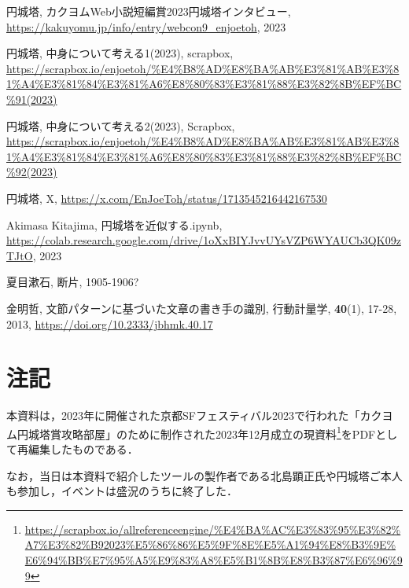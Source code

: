 \documentclass[10pt, a5paper, twoside]{jsarticle}
\theoremstyle{definition}
\begin{document}
	\begin{thebibliography}{99}

		 円城塔, カクヨムWeb小説短編賞2023円城塔インタビュー, \url{https://kakuyomu.jp/info/entry/webcon9_enjoetoh}, 2023

		 円城塔, 中身について考える1(2023), scrapbox, \url{https://scrapbox.io/enjoetoh/%E4%B8%AD%E8%BA%AB%E3%81%AB%E3%81%A4%E3%81%84%E3%81%A6%E8%80%83%E3%81%88%E3%82%8B%EF%BC%91(2023)}

		 円城塔, 中身について考える2(2023), Scrapbox, \url{https://scrapbox.io/enjoetoh/%E4%B8%AD%E8%BA%AB%E3%81%AB%E3%81%A4%E3%81%84%E3%81%A6%E8%80%83%E3%81%88%E3%82%8B%EF%BC%92(2023)}

		 円城塔, X, \url{https://x.com/EnJoeToh/status/1713545216442167530}

		 Akimasa Kitajima, 円城塔を近似する.ipynb, \url{https://colab.research.google.com/drive/1oXxBIYJvvUYsVZP6WYAUCb3QK09zTJtO}, 2023

		 夏目漱石, 断片, 1905-1906?

		 金明哲, 文節パターンに基づいた文章の書き手の識別, 行動計量学, \textbf{40}(1), 17-28, 2013, \url{https://doi.org/10.2333/jbhmk.40.17}

	\end{thebibliography}

	\section*{注記}

		本資料は，2023年に開催された京都SFフェスティバル2023で行われた「カクヨム円城塔賞攻略部屋」のために制作された2023年12月成立の現資料\footnote{\url{https://scrapbox.io/allreferenceengine/%E4%BA%AC%E3%83%95%E3%82%A7%E3%82%B92023%E5%86%86%E5%9F%8E%E5%A1%94%E8%B3%9E%E6%94%BB%E7%95%A5%E9%83%A8%E5%B1%8B%E8%B3%87%E6%96%99}}をPDFとして再編集したものである．

		なお，当日は本資料で紹介したツールの製作者である北島顕正氏や円城塔ご本人も参加し，イベントは盛況のうちに終了した．
\end{document}
